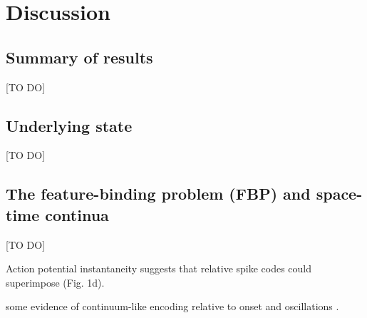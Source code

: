\documentclass{article}
\begin{document}





\section{Discussion}

\subsection*{Summary of results}
[TO DO]

\subsection*{Underlying state}
[TO DO]


\subsection*{The feature-binding problem (FBP) and space-time continua}
[TO DO]

Action potential instantaneity suggests that relative spike codes could superimpose (Fig. 1d).

some evidence of continuum-like encoding relative to onset \cite{gollisch2008rapid, storchi2012comparison} and oscillations \cite{havenith2011synchrony}.
\end{document}
